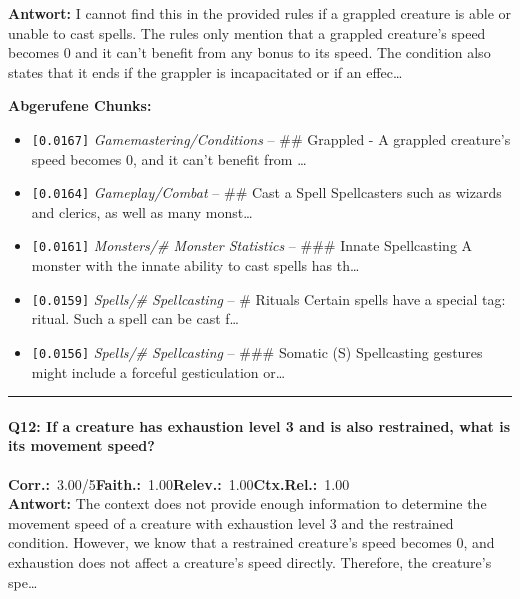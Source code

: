 \noindent\textbf{Antwort:} I cannot find this in the provided rules if a grappled creature is able or unable to cast spells. The rules only mention that a grappled creature's speed becomes 0 and it can't benefit from any bonus to its speed. The condition also states that it ends if the grappler is incapacitated or if an effec\ldots

\noindent\textbf{Abgerufene Chunks:}
\begin{itemize}[noitemsep, topsep=2pt]
  \item[\textbf{\#1}] \texttt{[0.0167]} \textit{Gamemastering/Conditions} -- \#\# Grappled  - A grappled creature's speed becomes 0, and it can't benefit from \ldots
  \item[\textbf{\#2}] \texttt{[0.0164]} \textit{Gameplay/Combat} -- \#\# Cast a Spell  Spellcasters such as wizards and clerics, as well as many monst\ldots
  \item[\textbf{\#3}] \texttt{[0.0161]} \textit{Monsters/# Monster Statistics} -- \#\#\# Innate Spellcasting  A monster with the innate ability to cast spells has th\ldots
  \item[\textbf{\#4}] \texttt{[0.0159]} \textit{Spells/# Spellcasting} -- \# Rituals  Certain spells have a special tag: ritual. Such a spell can be cast f\ldots
  \item[\textbf{\#5}] \texttt{[0.0156]} \textit{Spells/# Spellcasting} -- \#\#\# Somatic (S)  Spellcasting gestures might include a forceful gesticulation or\ldots
\end{itemize}
\vspace{4pt}
\hrule
\vspace{6pt}

\paragraph{Q12: If a creature has exhaustion level 3 and is also restrained, what is its movement speed?}
\noindent \textbf{Corr.:}~3.00/5\quad \textbf{Faith.:}~1.00\quad \textbf{Relev.:}~1.00\quad \textbf{Ctx.Rel.:}~1.00\\

\noindent\textbf{Antwort:} The context does not provide enough information to determine the movement speed of a creature with exhaustion level 3 and the restrained condition. However, we know that a restrained creature's speed becomes 0, and exhaustion does not affect a creature's speed directly. Therefore, the creature's spe\ldots

